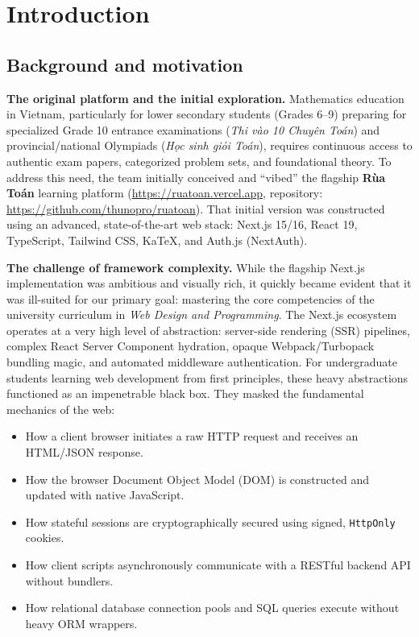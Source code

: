 \section{Introduction}

\subsection{Background and motivation}
\textbf{The original platform and the initial exploration.}
Mathematics education in Vietnam, particularly for lower secondary students (Grades 6--9) preparing
for specialized Grade 10 entrance examinations (\textit{Thi vào 10 Chuyên Toán}) and provincial/national
Olympiads (\textit{Học sinh giỏi Toán}), requires continuous access to authentic exam papers, categorized
problem sets, and foundational theory. To address this need, the team initially conceived and ``vibed''
the flagship \textbf{Rùa Toán} learning platform (\url{https://ruatoan.vercel.app}, repository:
\url{https://github.com/thunopro/ruatoan}). That initial version was constructed using an advanced,
state-of-the-art web stack: Next.js 15/16, React 19, TypeScript, Tailwind CSS, KaTeX, and Auth.js (NextAuth).

\textbf{The challenge of framework complexity.}
While the flagship Next.js implementation was ambitious and visually rich, it quickly became evident
that it was ill-suited for our primary goal: mastering the core competencies of the university curriculum
in \textit{Web Design and Programming}. The Next.js ecosystem operates at a very high level of abstraction:
server-side rendering (SSR) pipelines, complex React Server Component hydration, opaque Webpack/Turbopack
bundling magic, and automated middleware authentication. For undergraduate students learning web development
from first principles, these heavy abstractions functioned as an impenetrable black box. They masked the
fundamental mechanics of the web:
\begin{itemize}
  \item How a client browser initiates a raw HTTP request and receives an HTML/JSON response.
  \item How the browser Document Object Model (DOM) is constructed and updated with native JavaScript.
  \item How stateful sessions are cryptographically secured using signed, \texttt{HttpOnly} cookies.
  \item How client scripts asynchronously communicate with a RESTful backend API without bundlers.
  \item How relational database connection pools and SQL queries execute without heavy ORM wrappers.
\end{itemize}

